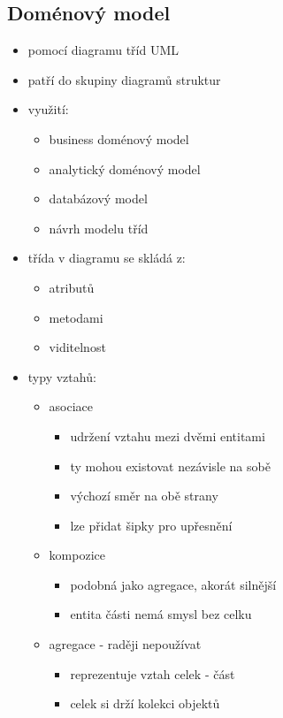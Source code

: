 \documentclass{szzclass}
\begin{document}
\subsection{Doménový model}
\begin{itemize}
    \item pomocí diagramu tříd UML
    \item patří do skupiny diagramů struktur
    \item využití:
    \begin{itemize}
        \item business doménový model
        \item analytický doménový model
        \item databázový model
        \item návrh modelu tříd
    \end{itemize}
    \item třída v diagramu se skládá z:
    \begin{itemize}
        \item atributů
        \item metodami
        \item viditelnost
    \end{itemize}
    \item typy vztahů:
    \begin{itemize}
        \item asociace
        \begin{itemize}
            \item udržení vztahu mezi dvěmi entitami
            \item ty mohou existovat nezávisle na sobě
            \item výchozí směr na obě strany
            \item lze přidat šipky pro upřesnění
        \end{itemize}
        \item kompozice
        \begin{itemize}
            \item podobná jako agregace, akorát silnější
            \item entita části nemá smysl bez celku
        \end{itemize}
        \item agregace - raději nepoužívat
        \begin{itemize}
            \item reprezentuje vztah celek - část
            \item celek si drží kolekci objektů

\end{itemize}
\end{itemize}
\end{itemize}
\end{document}
